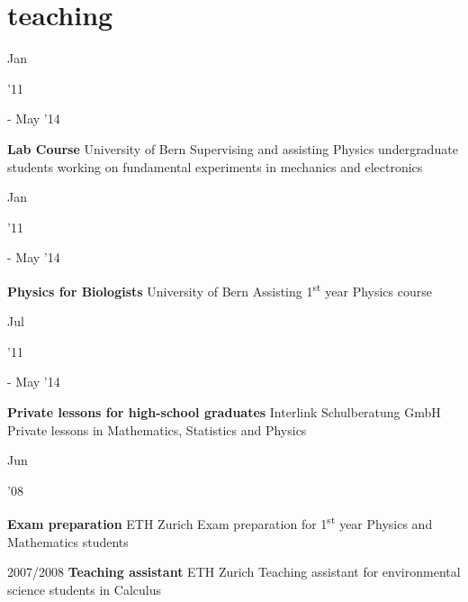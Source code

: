 \documentclass[]{cv} %
\begin{document}
\section{teaching}

\begin{entrylist}

  \entry
  {\parbox[t]{\parboxWidthOne}{Jan}\parbox[t]{\parboxWidthTwo}{\hfill '11} - May '14}
  {\textbf{Lab Course}}
  {University of Bern}
  {Supervising and assisting Physics undergraduate students working on fundamental experiments in mechanics and electronics}

  \entry
  {\parbox[t]{\parboxWidthOne}{Jan}\parbox[t]{\parboxWidthTwo}{\hfill '11} - May '14}
  {\textbf{Physics for Biologists}}
  {University of Bern}
  {Assisting 1\textsuperscript{st} year Physics course}

  \entry
  {\parbox[t]{\parboxWidthOne}{Jul}\parbox[t]{\parboxWidthTwo}{\hfill '11} - May '14}
  {\textbf{Private lessons for high-school graduates}}
  {Interlink Schulberatung GmbH}
  {Private lessons in Mathematics, Statistics and Physics}

  \entry
  {\parbox[t]{\parboxWidthOne}{Jun}\parbox[t]{\parboxWidthTwo}{\hfill '08}}
  {\textbf{Exam preparation}}
  {ETH Zurich}
  {Exam preparation for 1\textsuperscript{st} year Physics and Mathematics students}

  \entry
  {2007/2008}
  {\textbf{Teaching assistant}}
  {ETH Zurich}
  {Teaching assistant for environmental science students in Calculus}

\end{entrylist}

\newpage
\end{document}
